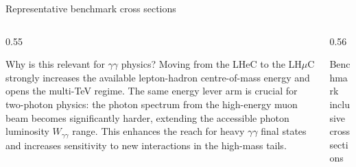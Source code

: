 \documentclass[aspectratio=1610,english]{beamer}
\begin{document}
\begin{frame}{Representative benchmark cross sections}
	
\begin{columns}%


		
\begin{column}{0.55\textwidth}	
\begin{block}{Why is this relevant for \(\gamma\gamma\) physics?}
\small  \justifying 
Moving from the LHeC to the LH\(\mu\)C strongly increases the available lepton-hadron centre-of-mass energy and opens the multi-TeV regime. The same energy lever arm is crucial for two-photon physics: the photon spectrum from the high-energy muon beam becomes significantly harder, extending the accessible photon luminosity  \(W_{\gamma\gamma}\) range. This enhances the reach for heavy \(\gamma\gamma\) final states and increases sensitivity to new interactions in the high-mass tails.
\end{block}
\end{column}


\begin{column}{0.56\textwidth}
			
{
				
\begin{block}{Benchmark inclusive cross sections}
\centering
\renewcommand{\arraystretch}{1.2}
					

\end{block}}
\end{column}
\end{columns}
\end{frame}
\end{document}
